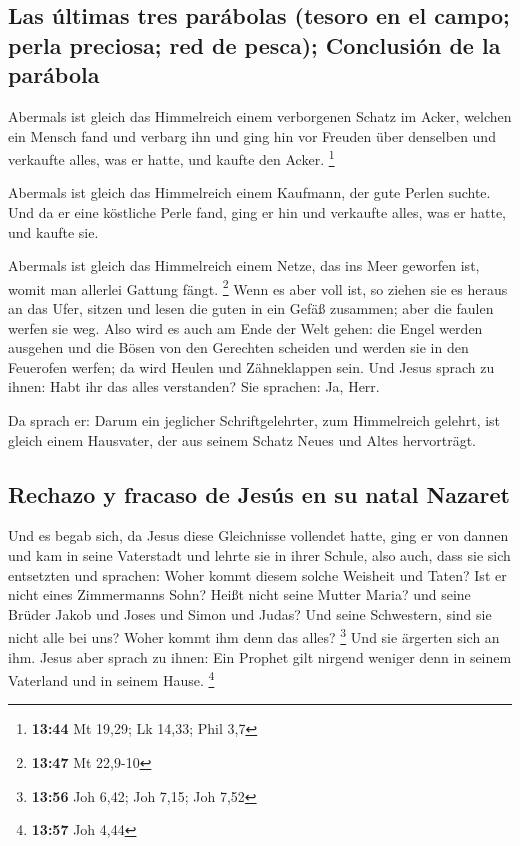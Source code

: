 \hypertarget{las-uxfaltimas-tres-paruxe1bolas-tesoro-en-el-campo-perla-preciosa-red-de-pesca-conclusiuxf3n-de-la-paruxe1bola}{%
\subsection{Las últimas tres parábolas (tesoro en el campo; perla
preciosa; red de pesca); Conclusión de la
parábola}\label{las-uxfaltimas-tres-paruxe1bolas-tesoro-en-el-campo-perla-preciosa-red-de-pesca-conclusiuxf3n-de-la-paruxe1bola}}

 Abermals ist gleich das Himmelreich einem verborgenen
Schatz im Acker, welchen ein Mensch fand und verbarg ihn und ging hin
vor Freuden über denselben und verkaufte alles, was er hatte, und kaufte
den Acker. \footnote{\textbf{13:44} Mt 19,29; Lk 14,33; Phil 3,7}

 Abermals ist gleich das Himmelreich einem Kaufmann, der
gute Perlen suchte.  Und da er eine köstliche Perle fand,
ging er hin und verkaufte alles, was er hatte, und kaufte sie.

 Abermals ist gleich das Himmelreich einem Netze, das ins
Meer geworfen ist, womit man allerlei Gattung fängt. \footnote{\textbf{13:47}
  Mt 22,9-10}  Wenn es aber voll ist, so ziehen sie es
heraus an das Ufer, sitzen und lesen die guten in ein Gefäß zusammen;
aber die faulen werfen sie weg.  Also wird es auch am
Ende der Welt gehen: die Engel werden ausgehen und die Bösen von den
Gerechten scheiden  und werden sie in den Feuerofen
werfen; da wird Heulen und Zähneklappen sein.  Und Jesus
sprach zu ihnen: Habt ihr das alles verstanden? Sie sprachen: Ja, Herr.

 Da sprach er: Darum ein jeglicher Schriftgelehrter, zum
Himmelreich gelehrt, ist gleich einem Hausvater, der aus seinem Schatz
Neues und Altes hervorträgt.

\hypertarget{rechazo-y-fracaso-de-jesuxfas-en-su-natal-nazaret}{%
\subsection{Rechazo y fracaso de Jesús en su natal
Nazaret}\label{rechazo-y-fracaso-de-jesuxfas-en-su-natal-nazaret}}

 Und es begab sich, da Jesus diese Gleichnisse vollendet
hatte, ging er von dannen  und kam in seine Vaterstadt
und lehrte sie in ihrer Schule, also auch, dass sie sich entsetzten und
sprachen: Woher kommt diesem solche Weisheit und Taten? 
Ist er nicht eines Zimmermanns Sohn? Heißt nicht seine Mutter Maria? und
seine Brüder Jakob und Joses und Simon und Judas?  Und
seine Schwestern, sind sie nicht alle bei uns? Woher kommt ihm denn das
alles? \footnote{\textbf{13:56} Joh 6,42; Joh 7,15; Joh 7,52}
 Und sie ärgerten sich an ihm. Jesus aber sprach zu
ihnen: Ein Prophet gilt nirgend weniger denn in seinem Vaterland und in
seinem Hause. \footnote{\textbf{13:57} Joh 4,44}

